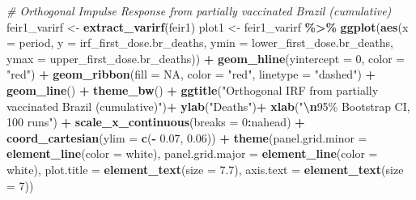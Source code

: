 \documentclass[
]{article}
\newenvironment{Shaded}{\begin{snugshade}}{\end{snugshade}}
\newcommand{\AttributeTok}[1]{\textcolor[rgb]{0.13,0.29,0.53}{#1}}
\newcommand{\CommentTok}[1]{\textcolor[rgb]{0.56,0.35,0.01}{\textit{#1}}}
\newcommand{\ConstantTok}[1]{\textcolor[rgb]{0.56,0.35,0.01}{#1}}
\newcommand{\DecValTok}[1]{\textcolor[rgb]{0.00,0.00,0.81}{#1}}
\newcommand{\FloatTok}[1]{\textcolor[rgb]{0.00,0.00,0.81}{#1}}
\newcommand{\FunctionTok}[1]{\textcolor[rgb]{0.13,0.29,0.53}{\textbf{#1}}}
\newcommand{\NormalTok}[1]{#1}
\newcommand{\OtherTok}[1]{\textcolor[rgb]{0.56,0.35,0.01}{#1}}
\newcommand{\SpecialCharTok}[1]{\textcolor[rgb]{0.81,0.36,0.00}{\textbf{#1}}}
\newcommand{\StringTok}[1]{\textcolor[rgb]{0.31,0.60,0.02}{#1}}
\renewenvironment{Shaded}{\begin{mdframed}[ backgroundcolor=shadecolor, linecolor = shadecolor, leftmargin=\dimexpr\leftmargin-2pt\relax, innerleftmargin=1.6pt, innertopmargin=5pt, skipabove=10pt,skipbelow=3pt ]}{\end{mdframed}}
\begin{document}
\begin{Shaded}
\begin{Highlighting}[]
\CommentTok{\# Orthogonal Impulse Response from partially vaccinated Brazil (cumulative)}
\NormalTok{feir1\_varirf }\OtherTok{\textless{}{-}} \FunctionTok{extract\_varirf}\NormalTok{(feir1)}
\NormalTok{plot1 }\OtherTok{\textless{}{-}}\NormalTok{ feir1\_varirf }\SpecialCharTok{\%\textgreater{}\%} 
  \FunctionTok{ggplot}\NormalTok{(}\FunctionTok{aes}\NormalTok{(}\AttributeTok{x =}\NormalTok{ period, }
             \AttributeTok{y =}\NormalTok{ irf\_first\_dose.br\_deaths, }
             \AttributeTok{ymin =}\NormalTok{ lower\_first\_dose.br\_deaths, }
             \AttributeTok{ymax =}\NormalTok{ upper\_first\_dose.br\_deaths)) }\SpecialCharTok{+}
  \FunctionTok{geom\_hline}\NormalTok{(}\AttributeTok{yintercept =} \DecValTok{0}\NormalTok{, }\AttributeTok{color =} \StringTok{"red"}\NormalTok{) }\SpecialCharTok{+}
  \FunctionTok{geom\_ribbon}\NormalTok{(}\AttributeTok{fill =} \ConstantTok{NA}\NormalTok{, }
              \AttributeTok{color =} \StringTok{"red"}\NormalTok{,}
              \AttributeTok{linetype =} \StringTok{"dashed"}\NormalTok{) }\SpecialCharTok{+}
  \FunctionTok{geom\_line}\NormalTok{() }\SpecialCharTok{+}
  \FunctionTok{theme\_bw}\NormalTok{() }\SpecialCharTok{+}
  \FunctionTok{ggtitle}\NormalTok{(}\StringTok{"Orthogonal IRF from partially vaccinated Brazil (cumulative)"}\NormalTok{)}\SpecialCharTok{+}
  \FunctionTok{ylab}\NormalTok{(}\StringTok{"Deaths"}\NormalTok{)}\SpecialCharTok{+}
  \FunctionTok{xlab}\NormalTok{(}\StringTok{"}\SpecialCharTok{\textbackslash{}n}\StringTok{95\% Bootstrap CI, 100 runs"}\NormalTok{) }\SpecialCharTok{+} 
  \FunctionTok{scale\_x\_continuous}\NormalTok{(}\AttributeTok{breaks =} \DecValTok{0}\SpecialCharTok{:}\NormalTok{nahead) }\SpecialCharTok{+}
  \FunctionTok{coord\_cartesian}\NormalTok{(}\AttributeTok{ylim =} \FunctionTok{c}\NormalTok{(}\SpecialCharTok{{-}} \FloatTok{0.07}\NormalTok{, }\FloatTok{0.06}\NormalTok{)) }\SpecialCharTok{+}
  \FunctionTok{theme}\NormalTok{(}\AttributeTok{panel.grid.minor =} \FunctionTok{element\_line}\NormalTok{(}\AttributeTok{color =} \StringTok{\textquotesingle{}white\textquotesingle{}}\NormalTok{),}
        \AttributeTok{panel.grid.major =} \FunctionTok{element\_line}\NormalTok{(}\AttributeTok{color =} \StringTok{\textquotesingle{}white\textquotesingle{}}\NormalTok{),}
        \AttributeTok{plot.title =} \FunctionTok{element\_text}\NormalTok{(}\AttributeTok{size =} \FloatTok{7.7}\NormalTok{),}
        \AttributeTok{axis.text =} \FunctionTok{element\_text}\NormalTok{(}\AttributeTok{size =} \DecValTok{7}\NormalTok{))}


\end{Highlighting}
\end{Shaded}
\end{document}
